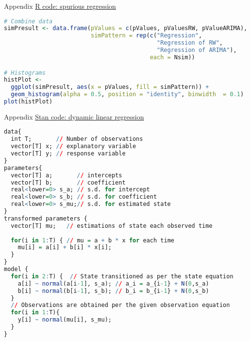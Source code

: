 \documentclass{beamer}\usepackage[]{graphicx}\usepackage[]{xcolor}
\begin{document}
\begin{frame}[fragile]{Appendix}
    \underline{R code: spurious regression}
    \fontsize{6pt}{6pt}\selectfont
    \begin{lstlisting}[language=R]
# Combine data 
simPresult <- data.frame(pValues = c(pValues, pValuesRW, pValueARIMA),
                         simPattern = rep(c("Regression", 
                                            "Regression of RW",
                                            "Regression of ARIMA"), 
                                          each = Nsim))

# Histograms
histPlot <- 
  ggplot(simPresult, aes(x = pValues, fill = simPattern)) + 
  geom_histogram(alpha = 0.5, position = "identity", binwidth  = 0.1)
plot(histPlot)
    \end{lstlisting}
\end{frame}

\begin{frame}[fragile]{Appendix}
    \underline{Stan code: dynamic linear regression}
    \fontsize{6pt}{6pt}\selectfont
    \begin{lstlisting}[language=R]
data{
  int T;       // Number of observations
  vector[T] x; // explanatory variable
  vector[T] y; // response variable
}
parameters{
  vector[T] a;       // intercepts
  vector[T] b;       // coefficient
  real<lower=0> s_a; // s.d. for intercept
  real<lower=0> s_b; // s.d. for coefficient
  real<lower=0> s_mu;// s.d. for estimated state
}
transformed parameters {
  vector[T] mu;   // estimations of state each observed time
  
  for(i in 1:T) { // mu = a + b * x for each time
    mu[i] = a[i] + b[i] * x[i];
  }
}
model {
  for(i in 2:T) {  // State transitioned as per the state equation
    a[i] ~ normal(a[i-1], s_a); // a_i = a_{i-1} + N(0,s_a)
    b[i] ~ normal(b[i-1], s_b); // b_i = b_{i-1} + N(0,s_b)
  }
  // Observations are obtained per the given observation equation
  for(i in 1:T){
    y[i] ~ normal(mu[i], s_mu);
  }
}
    \end{lstlisting}
\end{frame}
\end{document}
